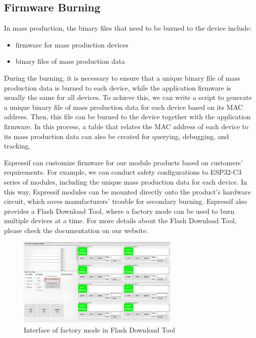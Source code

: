 \documentclass[a4paper,12pt,openany]{book}
\begin{document}
\subsection{Firmware Burning}

In mass production, the binary files that need to be burned to the device include:

\begin{itemize}
    \leftskip 1em
    \item firmware for mass production devices
    \setlength{\parskip}{0pt}
    \item binary files of mass production data
\end{itemize}

During the burning, it is necessary to ensure that a unique binary file of mass production data is burned to each device, while the application firmware is usually the same for all devices. To achieve this, we can write a script to generate a unique binary file of mass production data for each device based on its MAC address. Then, this file can be burned to the device together with the application firmware. In this process, a table that relates the MAC address of each device to its mass production data can also be created for querying, debugging, and tracking.

Espressif can customize firmware for our module products based on customers’ requirements. For example, we can conduct safety configurations to ESP32-C3 series of modules, including the unique mass production data for each device. In this way, Espressif modules can be mounted directly onto the product’s hardware circuit, which saves manufacturers’ trouble for secondary burning. Espressif also provides a Flash Download Tool, where a factory mode can be used to burn multiple devices at a time. For more details about the Flash Download Tool, please check the documentation on our website.
\begin{figure}[h!]
    \centering
    \includegraphics[width=0.7\textwidth]{D14Z/14-2}
    \caption{Interface of factory mode in Flash Download Tool}
\end{figure}
\end{document}
